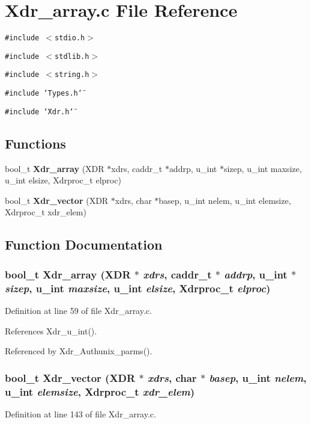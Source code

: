 \section{Xdr\_\-array.c File Reference}
\label{Xdr__array_8c}
{\tt \#include $<$stdio.h$>$}\par
{\tt \#include $<$stdlib.h$>$}\par
{\tt \#include $<$string.h$>$}\par
{\tt \#include \char`\"{}Types.h\char`\"{}}\par
{\tt \#include \char`\"{}Xdr.h\char`\"{}}\par
\subsection*{Functions}
\begin{CompactItemize}
\item 
bool\_\-t {\bf Xdr\_\-array} (XDR $\ast$xdrs, caddr\_\-t $\ast$addrp, u\_\-int $\ast$sizep, u\_\-int maxsize, u\_\-int elsize, Xdrproc\_\-t elproc)
\item 
bool\_\-t {\bf Xdr\_\-vector} (XDR $\ast$xdrs, char $\ast$basep, u\_\-int nelem, u\_\-int elemsize, Xdrproc\_\-t xdr\_\-elem)
\end{CompactItemize}


\subsection{Function Documentation}
\subsubsection{\setlength{\rightskip}{0pt plus 5cm}bool\_\-t Xdr\_\-array (XDR $\ast$ {\em xdrs}, caddr\_\-t $\ast$ {\em addrp}, u\_\-int $\ast$ {\em sizep}, u\_\-int {\em maxsize}, u\_\-int {\em elsize}, Xdrproc\_\-t {\em elproc})}\label{Xdr__array_8c_a0}




Definition at line 59 of file Xdr\_\-array.c.

References Xdr\_\-u\_\-int().

Referenced by Xdr\_\-Authunix\_\-parms().
\subsubsection{\setlength{\rightskip}{0pt plus 5cm}bool\_\-t Xdr\_\-vector (XDR $\ast$ {\em xdrs}, char $\ast$ {\em basep}, u\_\-int {\em nelem}, u\_\-int {\em elemsize}, Xdrproc\_\-t {\em xdr\_\-elem})}\label{Xdr__array_8c_a1}




Definition at line 143 of file Xdr\_\-array.c.